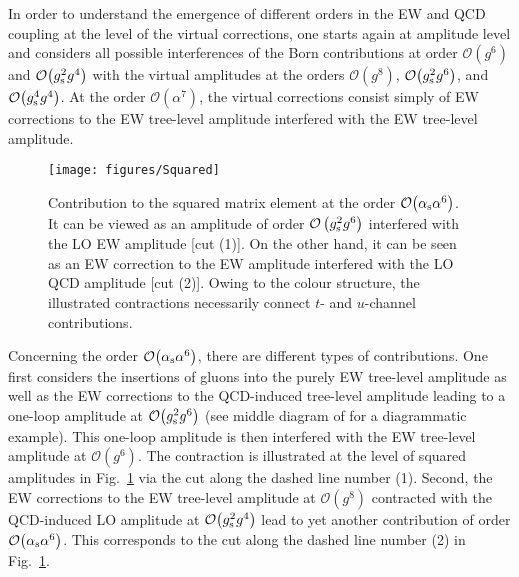 \documentclass[a4article,11pt]{article}
\begin{document}
In order to understand the emergence of different orders in the EW and
QCD coupling at the level of the virtual corrections, one starts again
at amplitude level and considers all possible interferences of the
Born contributions at order $\mathcal{O}{\left(g^{6}\right)}$ and
$\mathcal{O}{\left(g_{\rm s}^2 g^{4}\right)}$ with the virtual
amplitudes at the orders $\mathcal{O}{\left(g^{8}\right)}$,
$\mathcal{O}{\left(g_{\rm s}^2 g^{6}\right)}$, and
$\mathcal{O}{\left(g_{\rm s}^4 g^{4}\right)}$.
%
At the order $\mathcal{O}{\left(\alpha^{7}\right)}$, the virtual
corrections consist simply of EW corrections to the EW tree-level
amplitude interfered with the EW tree-level amplitude.
%
\begin{figure}[t]
\begin{center}
          \texttt{[image: figures/Squared]}
\end{center}
        \caption{Contribution to the squared matrix element at the
          order $\mathcal{O}{\left(\alpha_\text{s}\alpha^{6}\right)}$. 
        It can be viewed as an amplitude of order
        $\mathcal{O} \left( g^2_{\rm s} g^6 \right)$ interfered with
        the LO EW amplitude [cut (1)].
        On the other hand, it can be seen as an EW correction to the EW amplitude
        interfered with the LO QCD amplitude [cut (2)].
        Owing to the colour structure, the illustrated contractions
        necessarily connect $t$- and $u$-channel contributions.}         
\label{fig:SquaredMatrix}
\end{figure}
%
Concerning the order $\mathcal{O}{\left(\alpha_{\rm s}\alpha^{6}\right)}$, there are different types of
contributions. One first considers the insertions of gluons into the
purely EW tree-level amplitude as well as the EW corrections to the QCD-induced tree-level
amplitude leading to a one-loop amplitude at $\mathcal{O}{\left(g_{\rm s}^2 g^{6}\right)}$ (see middle diagram of  for a diagrammatic example).
This one-loop amplitude is then interfered with the EW tree-level
amplitude at $\mathcal{O}{\left(g^{6}\right)}$.
The contraction is illustrated at the level of squared amplitudes in Fig.~\ref{fig:SquaredMatrix} via the cut along the dashed line number (1).
Second, the EW corrections to the EW tree-level amplitude at $\mathcal{O}{\left(g^{8}\right)}$
contracted with the QCD-induced LO amplitude at $\mathcal{O}{\left(g_{\rm s}^2 g^{4}\right)}$ lead to yet another
contribution of order $\mathcal{O}{\left(\alpha_{\rm s}\alpha^{6}\right)}$. This corresponds to the cut along the dashed line number (2) in Fig.~\ref{fig:SquaredMatrix}.
\end{document}
